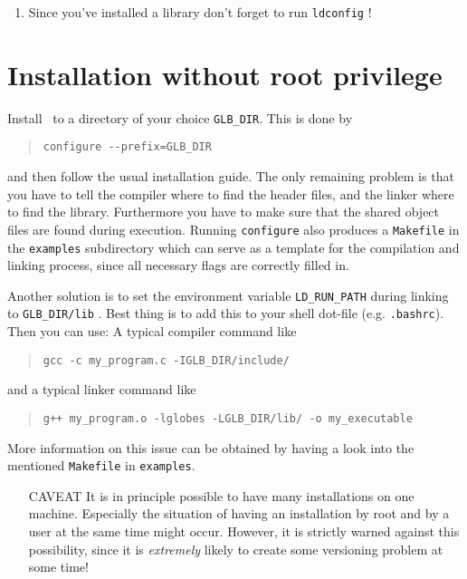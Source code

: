 \begin{appendix}
\begin{enumerate}
\item Since you've installed a library don't forget to run \verb+ldconfig+ !
\end{enumerate}
\section*{Installation without root privilege}
\label{inst_noroot}

Install \GLOBES\ to a directory of your choice \verb+GLB_DIR+. This is done by
\begin{quote}
\verb+configure --prefix=GLB_DIR+
\end{quote}
and then follow the usual installation guide. The only remaining problem
is that you have to tell the compiler where to find the header files, and 
the linker where to find the library. Furthermore you have to make sure 
that the shared object files are found during execution. Running 
\verb+configure+
also produces a \verb+Makefile+ in the \verb+examples+ 
subdirectory which can serve as
a template for the compilation and linking process, since all necessary
flags are correctly filled in. 

Another solution is to set the environment variable \verb+LD_RUN_PATH+
during linking to \verb+GLB_DIR/lib+ . Best thing is to add this to your
shell dot-file (e.g. \verb+.bashrc+). Then you can use:
A typical compiler command like
\begin{quote}
\verb+gcc -c my_program.c -IGLB_DIR/include/+
\end{quote}
and a typical linker command like
\begin{quote}
\verb#g++ my_program.o -lglobes -LGLB_DIR/lib/ -o my_executable#
\end{quote}
More information on this issue can be obtained by having a look 
into the mentioned  \verb+Makefile+ in \verb+examples+. 

\begin{itemize}
\item[CAVEAT] It is in principle possible to have many installations 
on one machine. Especially the situation of having an installation by root and by a user at the same time might occur. However, it is strictly warned against this possibility, since it is \emph{extremely} likely to create some versioning problem at some time!
\end{itemize}



\end{appendix}
